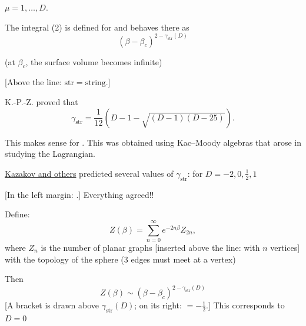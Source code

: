 $\mu=1,\ldots,D$.





The integral (2) is defined for
and behaves there as
\begin{equation*}
(\beta-\beta_c)^{2-\gamma_{\mathrm{str}}(D)}
\tag{3}
\end{equation*}

(at $\beta_c$, the surface volume becomes infinite)

[Above the line: $\mathrm{str}=\mathrm{string}$.]

K.-P.-Z. proved that
\begin{equation*}
\gamma_{\mathrm{str}}=\frac{1}{12}
\left(D-1-\sqrt{(D-1)(D-25)}\right).
\tag{4}
\end{equation*}

This makes sense for
.
This was obtained using Kac--Moody algebras that arose in studying
the Lagrangian.

\underline{Kazakov and others} predicted several values of $\gamma_{\mathrm{str}}$:
for $D=-2,0,\frac12,1$

[In the left margin:
.]
Everything agreed!!

Define:
\begin{equation*}
Z(\beta)=\sum_{n=0}^{\infty}e^{-2n\beta}Z_{2n},
\tag{5}
\end{equation*}
where $Z_n$ is the number of planar graphs
[inserted above the line: with $n$ vertices]
with the topology of the sphere
(3 edges must meet at a vertex)

Then
\begin{equation*}
Z(\beta)\sim(\beta-\beta_c)^{2-\gamma_{\mathrm{str}}(D)}
\tag{6}
\end{equation*}
[A bracket is drawn above $\gamma_{\mathrm{str}}(D)$; on its right: $=-\frac12$.]
This corresponds to $D=0$

